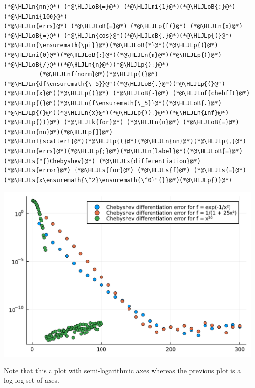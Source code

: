 \documentclass[12pt,a4paper]{article}
\newcommand{\HLJLk}[1]{\textcolor[RGB]{148,91,176}{\textbf{#1}}}
\newcommand{\HLJLn}[1]{#1}
\newcommand{\HLJLnf}[1]{\textcolor[RGB]{66,102,213}{#1}}
\newcommand{\HLJLs}[1]{\textcolor[RGB]{201,61,57}{#1}}
\newcommand{\HLJLni}[1]{\textcolor[RGB]{59,151,46}{#1}}
\newcommand{\HLJLoB}[1]{\textcolor[RGB]{102,102,102}{\textbf{#1}}}
\newcommand{\HLJLp}[1]{#1}
\begin{document}
\begin{lstlisting}
(*@\HLJLn{nn}@*) (*@\HLJLoB{=}@*) (*@\HLJLni{1}@*)(*@\HLJLoB{:}@*)(*@\HLJLni{100}@*)
(*@\HLJLn{errs}@*) (*@\HLJLoB{=}@*) (*@\HLJLp{[(}@*) (*@\HLJLn{x}@*) (*@\HLJLoB{=}@*) (*@\HLJLn{cos}@*)(*@\HLJLoB{.}@*)(*@\HLJLp{(}@*)(*@\HLJLn{\ensuremath{\pi}}@*)(*@\HLJLoB{*}@*)(*@\HLJLp{(}@*)(*@\HLJLni{0}@*)(*@\HLJLoB{:}@*)(*@\HLJLn{n}@*)(*@\HLJLp{)}@*)(*@\HLJLoB{/}@*)(*@\HLJLn{n}@*)(*@\HLJLp{);}@*)
          (*@\HLJLnf{norm}@*)(*@\HLJLp{(}@*)(*@\HLJLn{df\ensuremath{\_5}}@*)(*@\HLJLoB{.}@*)(*@\HLJLp{(}@*)(*@\HLJLn{x}@*)(*@\HLJLp{)}@*) (*@\HLJLoB{-}@*) (*@\HLJLnf{chebfft}@*)(*@\HLJLp{(}@*)(*@\HLJLn{f\ensuremath{\_5}}@*)(*@\HLJLoB{.}@*)(*@\HLJLp{(}@*)(*@\HLJLn{x}@*)(*@\HLJLp{)),}@*)(*@\HLJLn{Inf}@*)(*@\HLJLp{))}@*) (*@\HLJLk{for}@*) (*@\HLJLn{n}@*) (*@\HLJLoB{=}@*) (*@\HLJLn{nn}@*)(*@\HLJLp{]}@*)
(*@\HLJLnf{scatter!}@*)(*@\HLJLp{(}@*)(*@\HLJLn{nn}@*)(*@\HLJLp{,}@*)(*@\HLJLn{errs}@*)(*@\HLJLp{;}@*)(*@\HLJLn{label}@*)(*@\HLJLoB{=}@*)(*@\HLJLs{"{}Chebyshev}@*) (*@\HLJLs{differentiation}@*) (*@\HLJLs{error}@*) (*@\HLJLs{for}@*) (*@\HLJLs{f}@*) (*@\HLJLs{=}@*) (*@\HLJLs{x\ensuremath{\^2}\ensuremath{\^0}"{}}@*)(*@\HLJLp{)}@*)
\end{lstlisting}

\includegraphics[width=\linewidth]{jl_P71Faz/Chapter3_22_1.pdf}

Note that this a plot with semi-logarithmic axes whereas the previous plot is a log-log set of axes.
\end{document}
